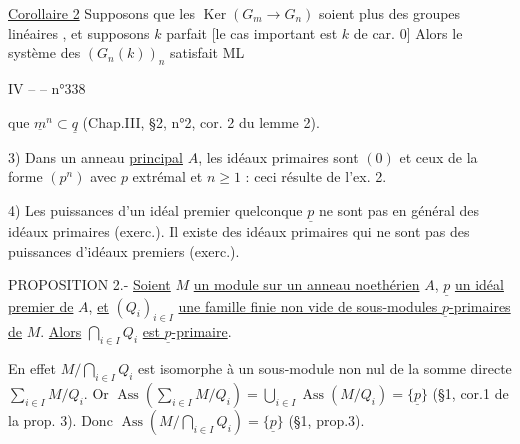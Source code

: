 

\uline{Corollaire 2} Supposons que les $\operatorname{Ker}(G_m\rightarrow G_n)$  soient \deleted{$=$} plus des groupes  linéaires ,  et supposons $k$ parfait [le cas important est $k$ de car. 0] Alors le système des $(G_n(k))_n$ satisfait ML



IV --  -- \hfill n°338

que $\underline m^n\subset\underline q$ (Chap.III, §2, n°2, cor. 2 du lemme 2).

3) Dans un anneau \uline{principal} $A$, les idéaux primaires sont $(0)$ et ceux de la forme $(p^n)$ avec $p$ extrémal et $n\geq1$ : ceci résulte de l'ex. 2.

4) Les puissances d'un idéal premier quelconque $\underline p$ ne sont pas en général des idéaux primaires (exerc.\quad). Il existe des idéaux primaires qui ne sont pas des puissances d'idéaux premiers (exerc.\quad).


PROPOSITION 2.- \uline{Soient} $M$ \uline{un module sur un anneau noethérien} $A$, $\underline p$ \uline{un idéal premier de} $A$, \uline{et} $(Q_i)_{i\in I}$ \uline{une famille finie non vide de sous-modules $\underline p$-primaires de} $M$. \uline{Alors} $\bigcap_{i\in I}Q_i$ \uline{est $\underline p$-primaire}.

En effet $M/\bigcap_{i\in I}Q_i$ est isomorphe à un sous-module non nul de la somme directe $\sum_{i\in I}M/Q_i$. Or $\operatorname{Ass}(\sum_{i\in I}M/Q_i)=\bigcup_{i\in I}\operatorname{Ass}(M/Q_i)=\{\underline p\}$ (§1, cor.1 de la prop. 3). Donc $\operatorname{Ass}(M/\bigcap_{i\in I}Q_i)=\{\underline p\}$ (§1, prop.3).

